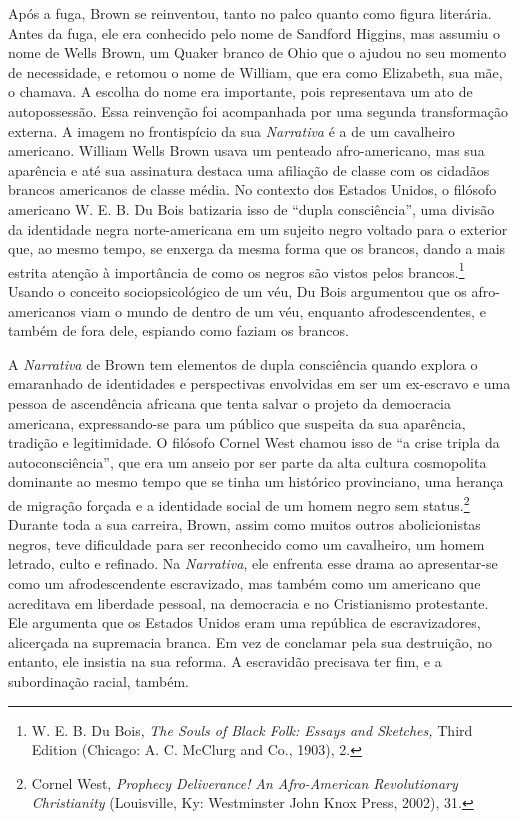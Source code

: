 Após a fuga, Brown se reinventou, tanto no palco quanto como figura
literária. Antes da fuga, ele era conhecido pelo nome de Sandford
Higgins, mas assumiu o nome de Wells Brown, um Quaker branco de Ohio que
o ajudou no seu momento de necessidade, e retomou o nome de William, que
era como Elizabeth, sua mãe, o chamava. A escolha do nome era
importante, pois representava um ato de autopossessão. Essa reinvenção
foi acompanhada por uma segunda transformação externa. A imagem no
frontispício da sua \emph{Narrativa} é a de um cavalheiro americano.
William Wells Brown usava um penteado afro-americano, mas sua aparência
e até sua assinatura destaca uma afiliação de classe com os cidadãos
brancos americanos de classe média. No contexto dos Estados Unidos, o
filósofo americano W. E. B. Du Bois batizaria isso de ``dupla
consciência'', uma divisão da identidade negra norte-americana em um
sujeito negro voltado para o exterior que, ao mesmo tempo, se enxerga da
mesma forma que os brancos, dando a mais estrita atenção à importância
de como os negros são vistos pelos brancos.\footnote{W. E. B. Du Bois,
  \emph{The Souls of Black Folk: Essays and Sketches,} Third Edition
  (Chicago: A. C. McClurg and Co., 1903), 2.} Usando o conceito
sociopsicológico de um véu, Du Bois argumentou que os afro-americanos
viam o mundo de dentro de um véu, enquanto afrodescendentes, e também de
fora dele, espiando como faziam os brancos.

A \emph{Narrativa} de Brown tem elementos de dupla consciência quando
explora o emaranhado de identidades e perspectivas envolvidas em ser um
ex-escravo e uma pessoa de ascendência africana que tenta salvar o
projeto da democracia americana, expressando-se para um público que
suspeita da sua aparência, tradição e legitimidade. O filósofo Cornel
West chamou isso de ``a crise tripla da autoconsciência'', que era um
anseio por ser parte da alta cultura cosmopolita dominante ao mesmo
tempo que se tinha um histórico provinciano, uma herança de migração
forçada e a identidade social de um homem negro sem status.\footnote{Cornel
  West, \emph{Prophecy Deliverance!} \emph{An Afro-American
  Revolutionary Christianity} (Louisville, Ky: Westminster John Knox
  Press, 2002), 31.} Durante toda a sua carreira, Brown, assim como
muitos outros abolicionistas negros, teve dificuldade para ser
reconhecido como um cavalheiro, um homem letrado, culto e refinado. Na
\emph{Narrativa}, ele enfrenta esse drama ao apresentar-se como um
afrodescendente escravizado, mas também como um americano que acreditava
em liberdade pessoal, na democracia e no Cristianismo protestante. Ele
argumenta que os Estados Unidos eram uma república de escravizadores,
alicerçada na supremacia branca. Em vez de conclamar pela sua
destruição, no entanto, ele insistia na sua reforma. A escravidão
precisava ter fim, e a subordinação racial, também.

